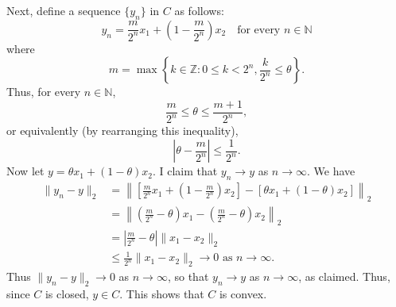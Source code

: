 \documentclass[letterpaper,12pt]{article}
\begin{document}
\begin{enumerate}
  Next, define a sequence $\{y_n\}$ in $C$ as follows:
  \begin{equation*}
    y_n = \frac{m}{2^n} x_1 + \left ( 1 - \frac{m}{2^n} \right ) x_2
      \quad \text{for every $n \in \mathbb{N}$}
  \end{equation*}
  where
  \begin{equation*}
    m = \max \left \{k \in \mathbb{Z} :
      0 \leq k < 2^n, \frac{k}{2^n} \leq \theta \right \}.
  \end{equation*}
  Thus, for every $n \in \mathbb{N}$,
  \begin{equation*}
    \frac{m}{2^n} \leq \theta \leq \frac{m + 1}{2^n},
  \end{equation*}
  or equivalently (by rearranging this inequality),
  \begin{equation*}
    \left | \theta - \frac{m}{2^n} \right | \leq \frac{1}{2^n}.
  \end{equation*}
  Now let $y = \theta x_1 + (1 - \theta) x_2$. I claim that
  $y_n \to y$ as $n \to \infty$. We have
  \begin{align*}
    \lVert y_n - y \rVert_2
      &= \left \lVert \left [
           \frac{m}{2^n} x_1 + \left ( 1 - \frac{m}{2^n} \right ) x_2 \right ] -
           [ \theta x_1 + (1 - \theta) x_2 ] \right \rVert_2 \\
      &= \left \lVert \left ( \frac{m}{2^n} - \theta \right ) x_1 -
           \left ( \frac{m}{2^n} - \theta \right ) x_2 \right \rVert_2 \\
      &= \left | \frac{m}{2^n} - \theta \right | \lVert x_1 - x_2 \rVert_2 \\
      &\leq \frac{1}{2^n} \lVert x_1 - x_2 \rVert_2
        \to 0 \text{ as } n \to \infty.
  \end{align*}
  Thus $\lVert y_n - y \rVert_2 \to 0$ as $n \to \infty$, so that
  $y_n \to y$ as $n \to \infty$, as claimed. Thus, since $C$ is
  closed, $y \in C$. This shows that $C$ is convex.


\end{enumerate}
\end{document}
